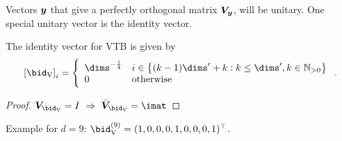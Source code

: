 Vectors $\bm{y}$ that give a perfectly orthogonal matrix $\bm{V}_{\bm{y}}$, will be unitary.
One special unitary vector is the identity vector.
\begin{corollary}
    The identity vector for VTB is given by
    \begin{equation}
        \sbr{\bid_{\ped{V}}}_i = \left\{ \begin{array}{ll}
                \dims^{-\frac{1}{4}} & i \in \cbr{(k - 1) \dims' + k : k \leq \dims', k \in \mathbb{N}_{>0}} \\
                0 & \text{otherwise}
        \end{array}\right. \text{.}
    \end{equation}
    \begin{proof}
        $\mat V_{\bid_{\ped{V}}} = I\ \Rightarrow\ \bar{\mat V}_{\bid_{\ped{V}}} = \imat$
    \end{proof}
\end{corollary}
Example for $d = 9$: $\bid_{\ped{V}}^{(9)} = (1, 0, 0, 0, 1, 0, 0, 0, 1)\Tr$.

